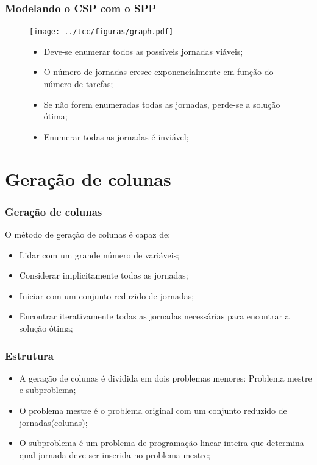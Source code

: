 \documentclass{beamer}
\begin{document}
\begin{frame}
    \frametitle{Modelando o CSP com o SPP}
    \begin{figure}[!htb]
        \centering
        \begin{minipage}{0.48\textwidth}
        {
            \centering
            \texttt{[image: ../tcc/figuras/graph.pdf]}
            \label{treta}
        }
        \end{minipage}
%
        \begin{minipage}{.48\textwidth}
            \begin{itemize}
                \item Deve-se enumerar todos as possíveis jornadas viáveis;
                \item O número de jornadas cresce exponencialmente em função do número de tarefas;
                \item Se não forem enumeradas todas as jornadas, perde-se a solução ótima;
                \item Enumerar todas as jornadas é inviável;
            \end{itemize}
        \end{minipage}
    \end{figure}
\end{frame}

\section{Geração de colunas}
\begin{frame}
    \frametitle{Geração de colunas}
    O método de geração de colunas é capaz de:

    \begin{itemize}
        \item Lidar com um grande número de variáveis;
        \item Considerar implicitamente todas as jornadas;
        \item Iniciar com um conjunto reduzido de jornadas;
        \item Encontrar iterativamente todas as jornadas necessárias para encontrar a solução ótima;
    \end{itemize}
\end{frame}

\begin{frame}
    \frametitle{Estrutura}

    \begin{itemize}
        \item A geração de colunas é dividida em dois problemas menores: Problema mestre e subproblema;
        \item O problema mestre é o problema original com um conjunto reduzido de jornadas(colunas);
        \item O subproblema é um problema de programação linear inteira que determina qual jornada
            deve ser inserida no problema mestre;
    \end{itemize}
\end{frame}
\end{document}
